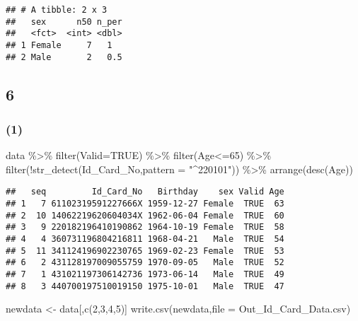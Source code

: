 \documentclass[
]{article}
\newenvironment{Shaded}{\begin{snugshade}}{\end{snugshade}}
\newcommand{\AttributeTok}[1]{\textcolor[rgb]{0.77,0.63,0.00}{#1}}
\newcommand{\ConstantTok}[1]{\textcolor[rgb]{0.00,0.00,0.00}{#1}}
\newcommand{\DecValTok}[1]{\textcolor[rgb]{0.00,0.00,0.81}{#1}}
\newcommand{\FunctionTok}[1]{\textcolor[rgb]{0.00,0.00,0.00}{#1}}
\newcommand{\NormalTok}[1]{#1}
\newcommand{\OtherTok}[1]{\textcolor[rgb]{0.56,0.35,0.01}{#1}}
\newcommand{\SpecialCharTok}[1]{\textcolor[rgb]{0.00,0.00,0.00}{#1}}
\newcommand{\StringTok}[1]{\textcolor[rgb]{0.31,0.60,0.02}{#1}}
\begin{document}
\begin{verbatim}
## # A tibble: 2 x 3
##   sex      n50 n_per
##   <fct>  <int> <dbl>
## 1 Female     7   1  
## 2 Male       2   0.5
\end{verbatim}

\hypertarget{section-14}{%
\subsection{6}\label{section-14}}

\hypertarget{section-15}{%
\subsubsection{(1)}\label{section-15}}

\begin{Shaded}
\begin{Highlighting}[]
\NormalTok{data  }\SpecialCharTok{\%\textgreater{}\%} \FunctionTok{filter}\NormalTok{(}\AttributeTok{Valid=}\ConstantTok{TRUE}\NormalTok{)  }\SpecialCharTok{\%\textgreater{}\%} \FunctionTok{filter}\NormalTok{(Age}\SpecialCharTok{\textless{}=}\DecValTok{65}\NormalTok{) }\SpecialCharTok{\%\textgreater{}\%} \FunctionTok{filter}\NormalTok{(}\SpecialCharTok{!}\FunctionTok{str\_detect}\NormalTok{(Id\_Card\_No,}\AttributeTok{pattern =} \StringTok{"\^{}220101"}\NormalTok{)) }\SpecialCharTok{\%\textgreater{}\%} \FunctionTok{arrange}\NormalTok{(}\FunctionTok{desc}\NormalTok{(Age))}
\end{Highlighting}
\end{Shaded}

\begin{verbatim}
##   seq         Id_Card_No   Birthday    sex Valid Age
## 1   7 61102319591227666X 1959-12-27 Female  TRUE  63
## 2  10 14062219620604034X 1962-06-04 Female  TRUE  60
## 3   9 220182196410190862 1964-10-19 Female  TRUE  58
## 4   4 360731196804216811 1968-04-21   Male  TRUE  54
## 5  11 341124196902230765 1969-02-23 Female  TRUE  53
## 6   2 431128197009055759 1970-09-05   Male  TRUE  52
## 7   1 431021197306142736 1973-06-14   Male  TRUE  49
## 8   3 440700197510019150 1975-10-01   Male  TRUE  47
\end{verbatim}

\begin{Shaded}
\begin{Highlighting}[]
\NormalTok{newdata }\OtherTok{\textless{}{-}}\NormalTok{ data[,}\FunctionTok{c}\NormalTok{(}\DecValTok{2}\NormalTok{,}\DecValTok{3}\NormalTok{,}\DecValTok{4}\NormalTok{,}\DecValTok{5}\NormalTok{)]}
\FunctionTok{write.csv}\NormalTok{(newdata,}\AttributeTok{file =} \StringTok{\textquotesingle{}Out\_Id\_Card\_Data.csv\textquotesingle{}}\NormalTok{)}
\end{Highlighting}
\end{Shaded}
\end{document}
